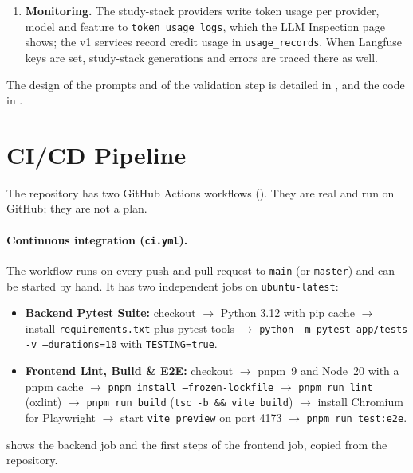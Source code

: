 \begin{enumerate}[leftmargin=*]
    quota-exhausted Gemini model falls back to \texttt{gemini-flash-latest}. The v1
    adapters do not retry; they convert provider errors into typed exceptions
    (authentication, rate limit with \texttt{Retry-After}, time-out, unavailable) that
    the routes return to the user. When no key is configured at all, the
    \texttt{/api/v1} features use the deterministic mock adapter.
  \item \textbf{Monitoring.} The study-stack providers write token usage per provider,
    model and feature to \texttt{token\_usage\_logs}, which the LLM Inspection page
    shows; the v1 services record credit usage in \texttt{usage\_records}. When Langfuse
    keys are set, study-stack generations and errors are traced there as well.
\end{enumerate}

The design of the prompts and of the validation step is detailed in
, and the code in .

\section{CI/CD Pipeline}\label{sec:cicd}

The repository has two GitHub Actions workflows (). They are real and run
on GitHub; they are not a plan.


\paragraph{Continuous integration (\texttt{ci.yml}).}
The workflow runs on every push and pull request to \texttt{main} (or
\texttt{master}) and can be started by hand. It has two independent jobs on
\texttt{ubuntu-latest}:
\begin{itemize}[leftmargin=*]
  \item \textbf{Backend Pytest Suite:} checkout $\rightarrow$ Python 3.12 with pip cache
    $\rightarrow$ install \texttt{requirements.txt} plus pytest tools $\rightarrow$
    \texttt{python -m pytest app/tests -v --durations=10} with \texttt{TESTING=true}.
  \item \textbf{Frontend Lint, Build \& E2E:} checkout $\rightarrow$ pnpm~9 and
    Node~20 with a pnpm cache $\rightarrow$ \texttt{pnpm install --frozen-lockfile}
    $\rightarrow$ \texttt{pnpm run lint} (oxlint) $\rightarrow$ \texttt{pnpm run build}
    (\texttt{tsc -b \&\& vite build}) $\rightarrow$ install Chromium for Playwright
    $\rightarrow$ start \texttt{vite preview} on port 4173 $\rightarrow$
    \texttt{pnpm run test:e2e}.
\end{itemize}
 shows the backend job and the first steps of the frontend job, copied
from the repository.

